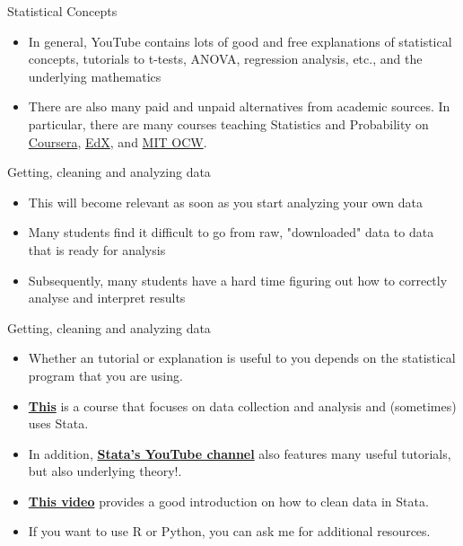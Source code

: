 \documentclass[aspectratio = 169, 12pt]{beamer}
\begin{document}
    \begin{frame}{Statistical Concepts}
        \begin{itemize}
            \item In general, YouTube contains lots of good and free explanations of statistical concepts, tutorials to t-tests, ANOVA, regression analysis, etc., and the underlying mathematics
            \item There are also many paid and unpaid alternatives from academic sources. In particular, there are many courses teaching Statistics and Probability on \href{https://www.coursera.org/search?query=Statistics\%20and\%20probability}{Coursera}, \href{https://www.edx.org/course?search_query=Statistics}{EdX}, and \href{https://ocw.mit.edu/search/ocwsearch.htm?q=Statistics}{MIT OCW}. 
        \end{itemize}
    \end{frame}
    
    \begin{frame}{Getting, cleaning and analyzing data}
        \begin{itemize}
            \item This will become relevant as soon as you start analyzing your own data
            \item Many students find it difficult to go from raw, "downloaded" data to data that is ready for analysis
            \item Subsequently, many students have a hard time figuring out how to correctly analyse and interpret results
        \end{itemize}
    \end{frame}
    
    \begin{frame}{Getting, cleaning and analyzing data}
        \begin{itemize}
            \item Whether an tutorial or explanation is useful to you depends on the statistical program that you are using. 
            \item \href{https://www.coursera.org/learn/data-collection-analytics-project}{\textbf{This}} is a course that focuses on data collection and analysis and (sometimes) uses Stata.
            \item In addition, \href{https://www.youtube.com/user/statacorp/playlists}{\textbf{Stata's YouTube channel}} also features many useful tutorials, but also underlying theory!. 
            \item \href{https://www.youtube.com/watch?v=464NA2jPWlo}{\textbf{This video}} provides a good introduction on how to clean data in Stata.
            \item If you want to use R or Python, you can ask me for additional resources.
        \end{itemize}
        
    \end{frame}
	
\end{document}
